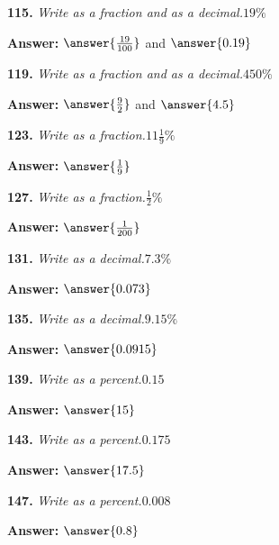 \documentclass{ximera}
\begin{document}
\begin{problem}
\textbf{115.} \emph{Write as a fraction and as a decimal.}\quad $19\%$

\textbf{Answer:} $\answer{\frac{19}{100}}$ and $\answer{0.19}$
\end{problem}

\begin{problem}
\textbf{119.} \emph{Write as a fraction and as a decimal.}\quad $450\%$

\textbf{Answer:} $\answer{\frac{9}{2}}$ and $\answer{4.5}$
\end{problem}

\begin{problem}
\textbf{123.} \emph{Write as a fraction.}\quad $11\tfrac{1}{9}\%$

\textbf{Answer:} $\answer{\frac{1}{9}}$
\end{problem}

\begin{problem}
\textbf{127.} \emph{Write as a fraction.}\quad $\tfrac{1}{2}\%$

\textbf{Answer:} $\answer{\frac{1}{200}}$
\end{problem}

\begin{problem}
\textbf{131.} \emph{Write as a decimal.}\quad $7.3\%$

\textbf{Answer:} $\answer{0.073}$
\end{problem}

\begin{problem}
\textbf{135.} \emph{Write as a decimal.}\quad $9.15\%$

\textbf{Answer:} $\answer{0.0915}$
\end{problem}

\begin{problem}
\textbf{139.} \emph{Write as a percent.}\quad $0.15$

\textbf{Answer:} $\answer{15}$
\end{problem}

\begin{problem}
\textbf{143.} \emph{Write as a percent.}\quad $0.175$

\textbf{Answer:} $\answer{17.5}$
\end{problem}

\begin{problem}
\textbf{147.} \emph{Write as a percent.}\quad $0.008$

\textbf{Answer:} $\answer{0.8}$
\end{problem}
\end{document}

